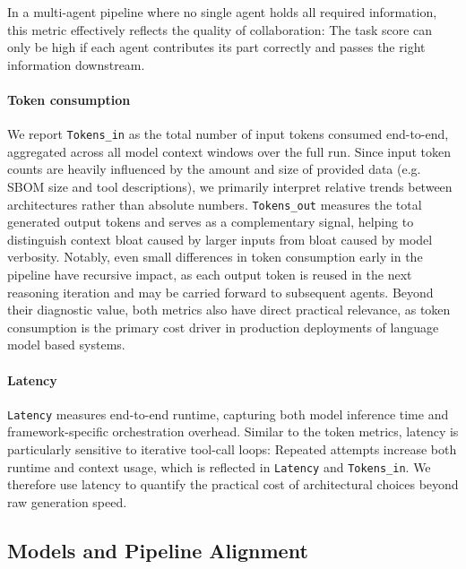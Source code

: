 In a multi-agent pipeline where no single agent holds all required information, this metric effectively reflects the quality of collaboration: The task score can only be high if each agent contributes its part correctly and passes the right information downstream.

\paragraph{Token consumption}
We report \texttt{Tokens\_in} as the total number of input tokens consumed end-to-end, aggregated across all model context windows over the full run. Since input token counts are heavily influenced by the amount and size of provided data (e.g. SBOM size and tool descriptions), we primarily interpret relative trends between architectures rather than absolute numbers. \texttt{Tokens\_out} measures the total generated output tokens and serves as a complementary signal, helping to distinguish context bloat caused by larger inputs from bloat caused by model verbosity. Notably, even small differences in token consumption early in the pipeline have recursive impact, as each output token is reused in the next reasoning iteration and may be carried forward to subsequent agents. Beyond their diagnostic value, both metrics also have direct practical relevance, as token consumption is the primary cost driver in production deployments of language model based systems.

\paragraph{Latency}
\texttt{Latency} measures end-to-end runtime, capturing both model inference time and framework-specific orchestration overhead.
Similar to the token metrics, latency is particularly sensitive to iterative tool-call loops: Repeated attempts increase both runtime and context usage, which is reflected in \texttt{Latency} and \texttt{Tokens\_in}.
We therefore use latency to quantify the practical cost of architectural choices beyond raw generation speed.

\subsection{Models and Pipeline Alignment}

